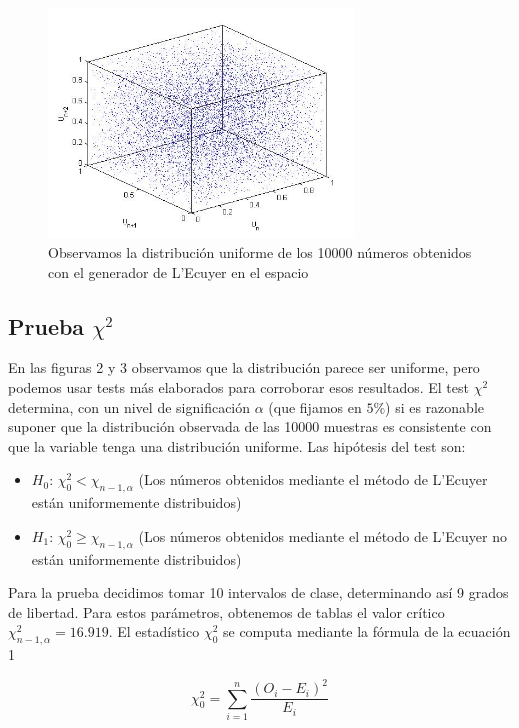 \documentclass[10pt,journal,compsoc]{IEEEtran}
\begin{document}
\begin{figure}[t]
\label{fig:3d}
\begin{center}
\centering
\includegraphics[width=3.2in]{3d.jpg}
\caption{Observamos la distribuci\'on uniforme de los 10000 n\'umeros obtenidos con el generador de L'Ecuyer en el espacio}
\end{center}
\end{figure}

\subsection{Prueba $\chi^2$}
En las figuras 2 y 3 observamos que la distribuci\'on parece ser uniforme, pero podemos usar
tests m\'as elaborados para corroborar esos resultados. El test $\chi^2$ determina, con un nivel
de significaci\'on $\alpha$ (que fijamos en $5\%$) si es razonable suponer que la distribuci\'on 
observada de las 10000 muestras es consistente con que la variable tenga una distribuci\'on uniforme.
Las hip\'otesis del test son:
\begin{itemize}
 \item {$H_{0}$:} $\chi_{0}^2 < \chi_{n-1,\alpha}$ (Los n\'umeros obtenidos mediante el m\'etodo de L'Ecuyer est\'an uniformemente distribuidos)
 \item {$H_{1}$:} $\chi_{0}^2 \ge \chi_{n-1,\alpha}$ (Los n\'umeros obtenidos mediante el m\'etodo de L'Ecuyer no est\'an uniformemente distribuidos)
\end{itemize}
Para la prueba decidimos tomar 10 intervalos de clase, determinando as\'i 9 grados de libertad. Para estos
par\'ametros, obtenemos de tablas el valor cr\'itico $\chi_{n-1,\alpha}^{2} = 16.919$. El estad\'istico $\chi_{0}^{2}$ se computa
mediante la f\'ormula de la ecuaci\'on 1

\begin{equation}
 \chi_{0}^{2} = \sum_{i=1}^{n} \frac{(O_i - E_i)^2}{E_i}
\end{equation}
\end{document}
